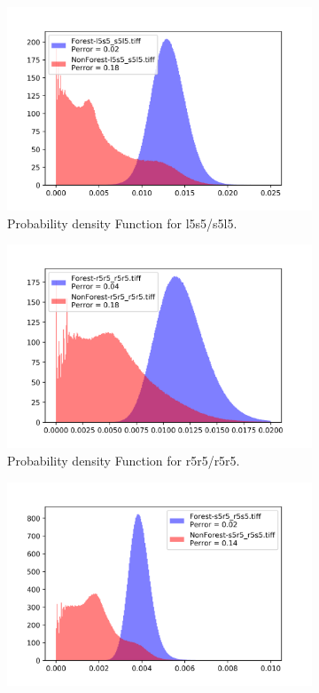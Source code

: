 \begin{figure}[H]
\begin{subfigure}[b]{0.4\linewidth}
    \includegraphics[width=\linewidth]{Chapter4/laws_textures/l5s5_s5l5.png}
     \caption{Probability density Function for l5s5/s5l5.}
  \end{subfigure}
  \centering
  \begin{subfigure}[b]{0.4\linewidth}
    \includegraphics[width=\linewidth]{Chapter4/laws_textures/r5r5_r5r5.png}
     \caption{Probability density Function for r5r5/r5r5.}
  \end{subfigure}
  \centering
  \begin{subfigure}[b]{0.4\linewidth}
    \includegraphics[width=\linewidth]{Chapter4/laws_textures/s5r5_r5s5.png}

\end{subfigure}
\end{figure}
